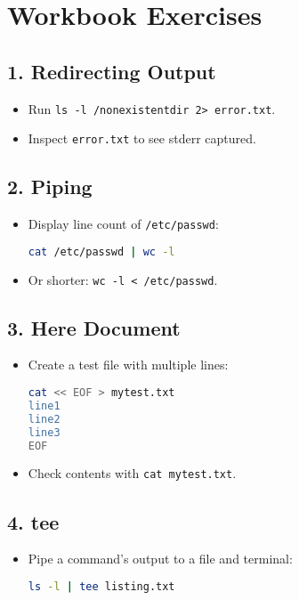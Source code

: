 \documentclass[a4paper]{report}
\begin{document}
\section*{Workbook Exercises}

\subsection*{1. Redirecting Output}
\begin{itemize}
    \item Run \texttt{ls -l /nonexistentdir 2> error.txt}.  
    \item Inspect \texttt{error.txt} to see stderr captured.
\end{itemize}

\subsection*{2. Piping}
\begin{itemize}
    \item Display line count of \texttt{/etc/passwd}:


\begin{lstlisting}[language=bash]
cat /etc/passwd | wc -l
\end{lstlisting}


    \item Or shorter: \texttt{wc -l < /etc/passwd}.
\end{itemize}

\subsection*{3. Here Document}
\begin{itemize}
    \item Create a test file with multiple lines:


\begin{lstlisting}[language=bash]
cat << EOF > mytest.txt
line1
line2
line3
EOF
\end{lstlisting}


    \item Check contents with \texttt{cat mytest.txt}.
\end{itemize}

\subsection*{4. tee}
\begin{itemize}
    \item Pipe a command’s output to a file and terminal:


\begin{lstlisting}[language=bash]
ls -l | tee listing.txt
\end{lstlisting}

\end{itemize}
\end{document}
